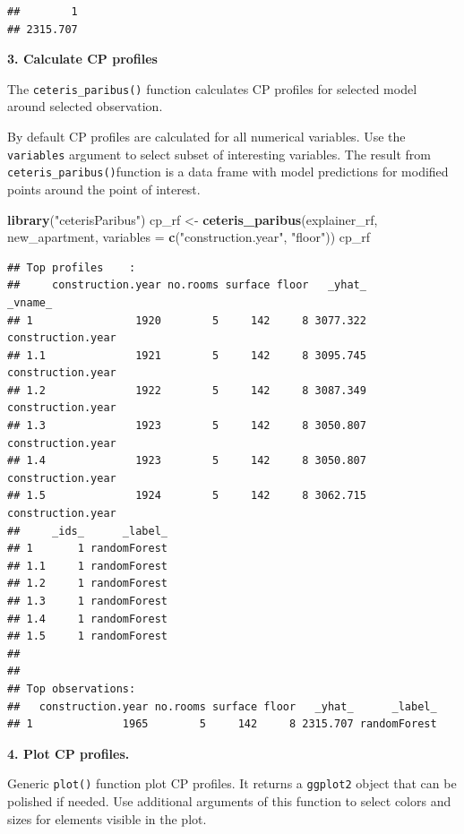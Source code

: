 \documentclass[]{book}
\newenvironment{Shaded}{\begin{snugshade}}{\end{snugshade}}
\newcommand{\DataTypeTok}[1]{\textcolor[rgb]{0.13,0.29,0.53}{#1}}
\newcommand{\KeywordTok}[1]{\textcolor[rgb]{0.13,0.29,0.53}{\textbf{#1}}}
\newcommand{\NormalTok}[1]{#1}
\newcommand{\StringTok}[1]{\textcolor[rgb]{0.31,0.60,0.02}{#1}}
\theoremstyle{definition}
\theoremstyle{definition}
\theoremstyle{definition}
\theoremstyle{remark}
\begin{document}
\begin{verbatim}
##        1 
## 2315.707
\end{verbatim}

\textbf{3. Calculate CP profiles}

The \texttt{ceteris\_paribus()} function calculates CP profiles for
selected model around selected observation.

By default CP profiles are calculated for all numerical variables. Use
the \texttt{variables} argument to select subset of interesting
variables. The result from \texttt{ceteris\_paribus()}function is a data
frame with model predictions for modified points around the point of
interest.

\begin{Shaded}
\begin{Highlighting}[]
\KeywordTok{library}\NormalTok{(}\StringTok{"ceterisParibus"}\NormalTok{)}
\NormalTok{cp_rf <-}\StringTok{ }\KeywordTok{ceteris_paribus}\NormalTok{(explainer_rf, new_apartment, }
                            \DataTypeTok{variables =} \KeywordTok{c}\NormalTok{(}\StringTok{"construction.year"}\NormalTok{, }\StringTok{"floor"}\NormalTok{))}
\NormalTok{cp_rf}
\end{Highlighting}
\end{Shaded}

\begin{verbatim}
## Top profiles    : 
##     construction.year no.rooms surface floor   _yhat_           _vname_
## 1                1920        5     142     8 3077.322 construction.year
## 1.1              1921        5     142     8 3095.745 construction.year
## 1.2              1922        5     142     8 3087.349 construction.year
## 1.3              1923        5     142     8 3050.807 construction.year
## 1.4              1923        5     142     8 3050.807 construction.year
## 1.5              1924        5     142     8 3062.715 construction.year
##     _ids_      _label_
## 1       1 randomForest
## 1.1     1 randomForest
## 1.2     1 randomForest
## 1.3     1 randomForest
## 1.4     1 randomForest
## 1.5     1 randomForest
## 
## 
## Top observations:
##   construction.year no.rooms surface floor   _yhat_      _label_
## 1              1965        5     142     8 2315.707 randomForest
\end{verbatim}

\textbf{4. Plot CP profiles.}

Generic \texttt{plot()} function plot CP profiles. It returns a
\texttt{ggplot2} object that can be polished if needed. Use additional
arguments of this function to select colors and sizes for elements
visible in the plot.
\end{document}
